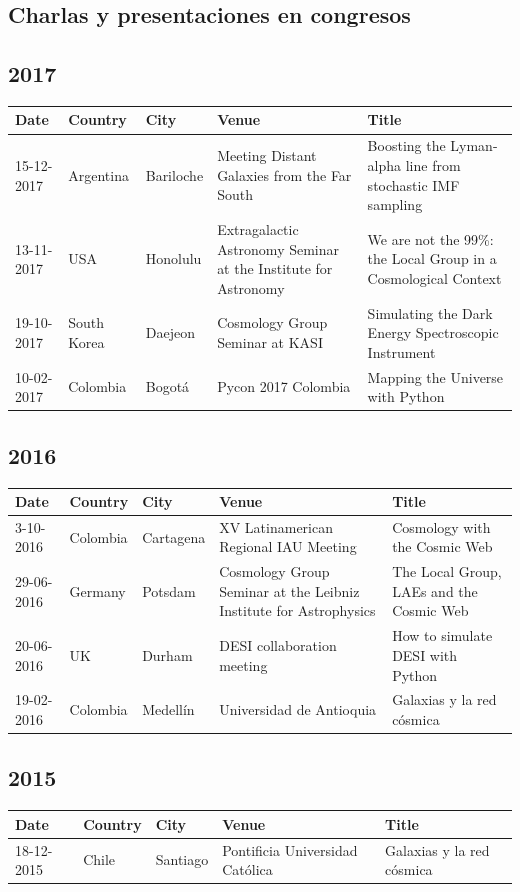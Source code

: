 \documentclass{article}
\begin{document}
\subsection{Charlas y presentaciones en congresos}

\subsection*{2017}
\noindent
\begin{tabular}{p{2.0cm} p{1.5cm} p{1.5cm} p{5.0cm} p{5.0cm}}\hline
Date & Country & City& Venue & Title\\\hline
15-12-2017 & Argentina & Bariloche & Meeting Distant Galaxies from the
Far South & Boosting the Lyman-alpha line from stochastic IMF sampling\\
13-11-2017 & USA & Honolulu & Extragalactic Astronomy Seminar at the Institute for Astronomy & We are not the 99\%: the Local Group in a Cosmological Context\\
19-10-2017 & South Korea & Daejeon & Cosmology Group Seminar at KASI & Simulating the Dark Energy Spectroscopic Instrument\\
10-02-2017 & Colombia & Bogot\'a & Pycon 2017 Colombia & Mapping the Universe with Python\\
\end{tabular}

\subsection*{2016}
\noindent
\begin{tabular}{p{2.0cm} p{1.5cm} p{1.5cm} p{5.0cm} p{5.0cm}}\hline
Date & Country & City& Venue & Title\\\hline
3-10-2016 & Colombia & Cartagena & XV Latinamerican Regional IAU Meeting & Cosmology with the Cosmic Web\\
29-06-2016 & Germany & Potsdam & Cosmology Group Seminar at the Leibniz Institute for Astrophysics & The Local Group, LAEs and the Cosmic Web\\
20-06-2016 & UK & Durham & DESI collaboration meeting & How to simulate DESI with Python\\
19-02-2016 & Colombia & Medell\'in & Universidad de Antioquia & Galaxias y la red c\'osmica\\
\end{tabular}

\subsection*{2015}
\noindent
\begin{tabular}{p{2.0cm} p{1.5cm} p{1.5cm} p{5.0cm} p{5.0cm}}\hline
Date & Country & City& Venue & Title\\\hline
18-12-2015 & Chile & Santiago & Pontificia Universidad Cat\'olica& Galaxias y la red c\'osmica \\
\end{tabular}
\end{document}
